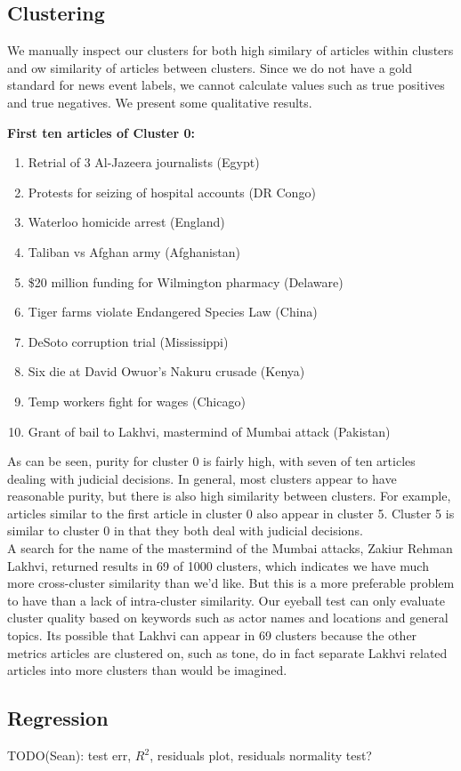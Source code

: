 
\subsection{Clustering}

We manually inspect our clusters for both high similary of articles within clusters and ow similarity of articles between clusters. Since we do not have a gold standard for news event labels, we cannot calculate values such as true positives and true negatives. We present some qualitative results.

\textbf{First ten articles of Cluster 0:}  
\begin{enumerate}
\item Retrial of 3 Al-Jazeera journalists (Egypt)
\item Protests for seizing of hospital accounts (DR Congo)
\item Waterloo homicide arrest (England)
\item Taliban vs Afghan army (Afghanistan)
\item \$20 million funding for Wilmington pharmacy (Delaware)
\item Tiger farms violate Endangered Species Law (China)
\item DeSoto corruption trial (Mississippi)
\item Six die at David Owuor's Nakuru crusade (Kenya)
\item Temp workers fight for wages (Chicago)
\item Grant of bail to Lakhvi, mastermind of Mumbai attack (Pakistan)
\end{enumerate}

As can be seen, purity for cluster 0 is fairly high, with seven of ten articles dealing with judicial decisions. In general, most clusters appear to have reasonable purity, but there is also high similarity between clusters. For example, articles similar to the first article in cluster 0 also appear in cluster 5. Cluster 5 is similar to cluster 0 in that they both deal with judicial decisions.\\

\noindent A search for the name of the mastermind of the Mumbai attacks, Zakiur Rehman Lakhvi, returned results in 69 of 1000 clusters, which indicates we have much more cross-cluster similarity than we'd like. But this is a more preferable problem to have than a lack of intra-cluster similarity. Our eyeball test can only evaluate cluster quality based on keywords such as actor names and locations and general topics. Its possible that Lakhvi can appear in 69 clusters because the other metrics articles are clustered on, such as tone, do in fact separate Lakhvi related articles into more clusters than would be imagined.

\subsection{Regression}

TODO(Sean): test err, $R^2$, residuals plot, residuals normality test?